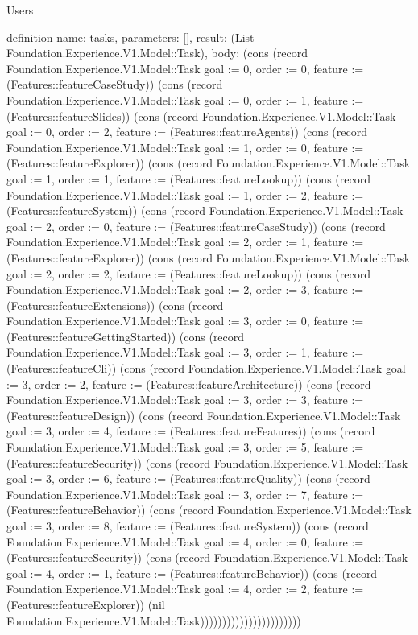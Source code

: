 \begin{lexlean}{Users}
\begin{semanticmodule}
definition{
  name: tasks,
  parameters: [],
  result: (List Foundation.Experience.V1.Model::Task),
  body: (cons (record Foundation.Experience.V1.Model::Task {goal := 0, order := 0, feature := (Features::featureCaseStudy)}) (cons (record Foundation.Experience.V1.Model::Task {goal := 0, order := 1, feature := (Features::featureSlides)}) (cons (record Foundation.Experience.V1.Model::Task {goal := 0, order := 2, feature := (Features::featureAgents)}) (cons (record Foundation.Experience.V1.Model::Task {goal := 1, order := 0, feature := (Features::featureExplorer)}) (cons (record Foundation.Experience.V1.Model::Task {goal := 1, order := 1, feature := (Features::featureLookup)}) (cons (record Foundation.Experience.V1.Model::Task {goal := 1, order := 2, feature := (Features::featureSystem)}) (cons (record Foundation.Experience.V1.Model::Task {goal := 2, order := 0, feature := (Features::featureCaseStudy)}) (cons (record Foundation.Experience.V1.Model::Task {goal := 2, order := 1, feature := (Features::featureExplorer)}) (cons (record Foundation.Experience.V1.Model::Task {goal := 2, order := 2, feature := (Features::featureLookup)}) (cons (record Foundation.Experience.V1.Model::Task {goal := 2, order := 3, feature := (Features::featureExtensions)}) (cons (record Foundation.Experience.V1.Model::Task {goal := 3, order := 0, feature := (Features::featureGettingStarted)}) (cons (record Foundation.Experience.V1.Model::Task {goal := 3, order := 1, feature := (Features::featureCli)}) (cons (record Foundation.Experience.V1.Model::Task {goal := 3, order := 2, feature := (Features::featureArchitecture)}) (cons (record Foundation.Experience.V1.Model::Task {goal := 3, order := 3, feature := (Features::featureDesign)}) (cons (record Foundation.Experience.V1.Model::Task {goal := 3, order := 4, feature := (Features::featureFeatures)}) (cons (record Foundation.Experience.V1.Model::Task {goal := 3, order := 5, feature := (Features::featureSecurity)}) (cons (record Foundation.Experience.V1.Model::Task {goal := 3, order := 6, feature := (Features::featureQuality)}) (cons (record Foundation.Experience.V1.Model::Task {goal := 3, order := 7, feature := (Features::featureBehavior)}) (cons (record Foundation.Experience.V1.Model::Task {goal := 3, order := 8, feature := (Features::featureSystem)}) (cons (record Foundation.Experience.V1.Model::Task {goal := 4, order := 0, feature := (Features::featureSecurity)}) (cons (record Foundation.Experience.V1.Model::Task {goal := 4, order := 1, feature := (Features::featureBehavior)}) (cons (record Foundation.Experience.V1.Model::Task {goal := 4, order := 2, feature := (Features::featureExplorer)}) (nil Foundation.Experience.V1.Model::Task)))))))))))))))))))))))
}


\end{semanticmodule}
\end{lexlean}
